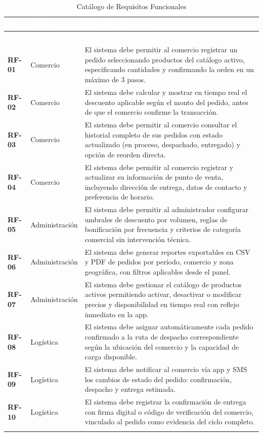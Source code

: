 \documentclass[12pt, a4paper]{report}
\begin{document}
\begin{longtable}{>{\bfseries\color{utplblue}}p{1.5cm} p{2.5cm} p{9.5cm}}
\toprule
\rowcolor{utplblue}
\textcolor{white}{\textbf{ID}} &
\textcolor{white}{\textbf{Módulo}} &
\textcolor{white}{\textbf{Requisito Funcional}} \\
\midrule
\endfirsthead
\toprule
\rowcolor{utplblue}
\textcolor{white}{\textbf{ID}} &
\textcolor{white}{\textbf{Módulo}} &
\textcolor{white}{\textbf{Requisito Funcional}} \\
\midrule
\endhead
\rowcolor{lightgray}
RF-01 & Comercio & El sistema debe permitir al comercio registrar un pedido seleccionando productos del catálogo activo, especificando cantidades y confirmando la orden en un máximo de 3 pasos. \\
\rowcolor{white}
RF-02 & Comercio & El sistema debe calcular y mostrar en tiempo real el descuento aplicable según el monto del pedido, antes de que el comercio confirme la transacción. \\
\rowcolor{lightgray}
RF-03 & Comercio & El sistema debe permitir al comercio consultar el historial completo de sus pedidos con estado actualizado (en proceso, despachado, entregado) y opción de reorden directa. \\
\rowcolor{white}
RF-04 & Comercio & El sistema debe permitir al comercio registrar y actualizar su información de punto de venta, incluyendo dirección de entrega, datos de contacto y preferencia de horario. \\
\rowcolor{lightgray}
RF-05 & Administración & El sistema debe permitir al administrador configurar umbrales de descuento por volumen, reglas de bonificación por frecuencia y criterios de categoría comercial sin intervención técnica. \\
\rowcolor{white}
RF-06 & Administración & El sistema debe generar reportes exportables en CSV y PDF de pedidos por período, comercio y zona geográfica, con filtros aplicables desde el panel. \\
\rowcolor{lightgray}
RF-07 & Administración & El sistema debe gestionar el catálogo de productos activos permitiendo activar, desactivar o modificar precios y disponibilidad en tiempo real con reflejo inmediato en la app. \\
\rowcolor{white}
RF-08 & Logística & El sistema debe asignar automáticamente cada pedido confirmado a la ruta de despacho correspondiente según la ubicación del comercio y la capacidad de carga disponible. \\
\rowcolor{lightgray}
RF-09 & Logística & El sistema debe notificar al comercio vía app y SMS los cambios de estado del pedido: confirmación, despacho y entrega estimada. \\
\rowcolor{white}
RF-10 & Logística & El sistema debe registrar la confirmación de entrega con firma digital o código de verificación del comercio, vinculado al pedido como evidencia del ciclo completo. \\
\bottomrule
\caption{Catálogo de Requisitos Funcionales}
\end{longtable}
\end{document}
